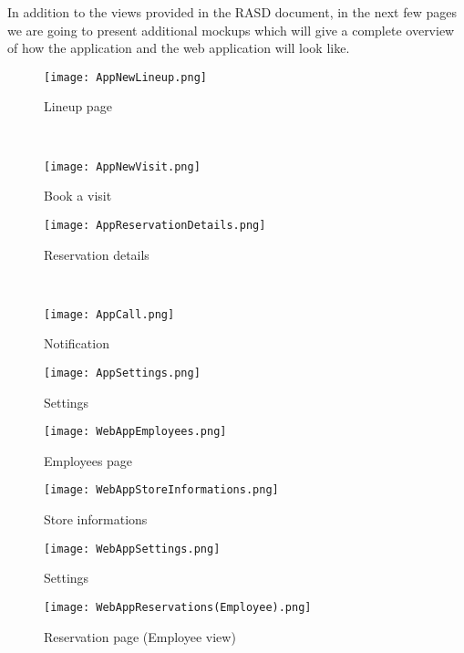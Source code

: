 In addition to the views provided in the RASD document, in the next few pages we are going to present additional mockups which will give a complete overview of how the application and the web application will look like.

\begin{figure}[H]
    \begin{minipage}[b]{8cm}
    \centering
    \texttt{[image: AppNewLineup.png]}
    \caption{Lineup page}
    \end{minipage}
    \ \hspace{2mm} \hspace{3mm} \
    \begin{minipage}[b]{8cm}
    \centering
    \texttt{[image: AppNewVisit.png]}
    \caption{Book a visit}
    \end{minipage}
\end{figure}

\begin{figure}[H]
    \begin{minipage}[b]{8cm}
    \centering
    \texttt{[image: AppReservationDetails.png]}
    \caption{Reservation details}
    \end{minipage}
    \ \hspace{2mm} \hspace{3mm} \
    \begin{minipage}[b]{8cm}
    \centering
    \texttt{[image: AppCall.png]}
    \caption{Notification}
    \end{minipage}
\end{figure}

\begin{figure}[H]
    \centering
    \texttt{[image: AppSettings.png]}
    \caption{Settings}
\end{figure}

\begin{figure}[H]
    \centering
    \texttt{[image: WebAppEmployees.png]}
    \caption{Employees page}
\end{figure}

\begin{figure}[H]
    \centering
    \texttt{[image: WebAppStoreInformations.png]}
    \caption{Store informations}
\end{figure}

\begin{figure}[H]
    \centering
    \texttt{[image: WebAppSettings.png]}
    \caption{Settings}
\end{figure}

\begin{figure}[H]
    \centering
    \texttt{[image: WebAppReservations(Employee).png]}
    \caption{Reservation page (Employee view)}
\end{figure}